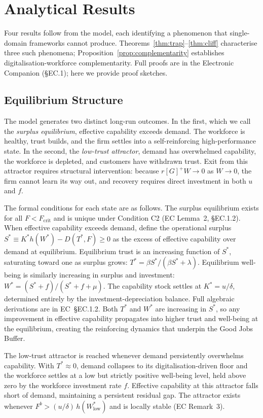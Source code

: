 \documentclass[msom,dblanonrev]{informs4}
\newcommand{\Gp}{[G]^{+}}
\begin{document}
\section{Analytical Results}\label{sec:analysis}

Four results follow from the model, each identifying a phenomenon that single-domain frameworks cannot produce. Theorems~\ref{thm:trap}--\ref{thm:cliff} characterise three such phenomena; Proposition~\ref{prop:complementarity} establishes digitalisation-workforce complementarity. Full proofs are in the Electronic Companion (\S EC.1); here we provide proof sketches.

\subsection{Equilibrium Structure}\label{sec:analysis:eq}

The model generates two distinct long-run outcomes. In the first, which we call the \emph{surplus equilibrium}, effective capability exceeds demand. The workforce is healthy, trust builds, and the firm settles into a self-reinforcing high-performance state. In the second, the \emph{low-trust attractor}, demand has overwhelmed capability, the workforce is depleted, and customers have withdrawn trust. Exit from this attractor requires structural intervention: because $r\Gp W \to 0$ as $W \to 0$, the firm cannot learn its way out, and recovery requires direct investment in both $u$ and $f$.

The formal conditions for each state are as follows. The surplus equilibrium exists for all $F < F_{\mathrm{crit}}$ and is unique under Condition C2 (EC Lemma~2, \S EC.1.2). When effective capability exceeds demand, define the operational surplus $S^* \equiv K^*h(W^*) - D(T^*,F) \geq 0$ as the excess of effective capability over demand at equilibrium. Equilibrium trust is an increasing function of $S^*$, saturating toward one as surplus grows: $T^* = \beta S^* / (\beta S^* + \lambda)$. Equilibrium well-being is similarly increasing in surplus and investment: $W^* = (S^* + f) / (S^* + f + \mu)$. The capability stock settles at $K^* = u/\delta$, determined entirely by the investment-depreciation balance. Full algebraic derivations are in EC~\S EC.1.2. Both $T^*$ and $W^*$ are increasing in $S^*$, so any improvement in effective capability propagates into higher trust and well-being at the equilibrium, creating the reinforcing dynamics that underpin the Good Jobs Buffer.

The low-trust attractor is reached whenever demand persistently overwhelms capability. With $T^* \approx 0$, demand collapses to its digitalisation-driven floor and the workforce settles at a low but strictly positive well-being level, held above zero by the workforce investment rate $f$. Effective capability at this attractor falls short of demand, maintaining a persistent residual gap. The attractor exists whenever $F^b > (u/\delta)\,h(W^*_{\mathrm{low}})$ and is locally stable (EC Remark~3).
\end{document}
